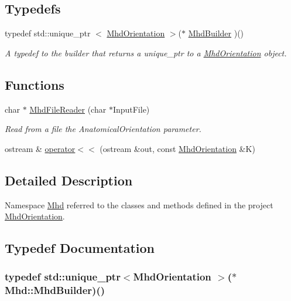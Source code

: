 \subsection*{\-Typedefs}
\begin{DoxyCompactItemize}
\item 
typedef std\-::unique\-\_\-ptr\*
$<$ \hyperlink{classMhd_1_1MhdOrientation}{\-Mhd\-Orientation} $>$($\ast$ \hyperlink{namespaceMhd_a9b520e48eb7e726a85e6224875935aff}{\-Mhd\-Builder} )()
\begin{DoxyCompactList}\small\item\em \-A typedef to the builder that returns a unique\-\_\-ptr to a \hyperlink{classMhd_1_1MhdOrientation}{\-Mhd\-Orientation} object. \end{DoxyCompactList}\end{DoxyCompactItemize}
\subsection*{\-Functions}
\begin{DoxyCompactItemize}
\item 
char $\ast$ \hyperlink{namespaceMhd_a85b72f6dc94ee4438e1511c3111686cb}{\-Mhd\-File\-Reader} (char $\ast$\-Input\-File)
\begin{DoxyCompactList}\small\item\em \-Read from a file the \-Anatomical\-Orientation parameter. \end{DoxyCompactList}\item 
ostream \& \hyperlink{namespaceMhd_a25ff0eba5426054880f213fb49a75670}{operator$<$$<$} (ostream \&out, const \hyperlink{classMhd_1_1MhdOrientation}{\-Mhd\-Orientation} \&\-K)
\end{DoxyCompactItemize}


\subsection{\-Detailed \-Description}
\-Namespace \hyperlink{namespaceMhd}{\-Mhd} referred to the classes and methods defined in the project \hyperlink{classMhd_1_1MhdOrientation}{\-Mhd\-Orientation}. 

\subsection{\-Typedef \-Documentation}
\hypertarget{namespaceMhd_a9b520e48eb7e726a85e6224875935aff}{
\subsubsection[{\-Mhd\-Builder}]{\setlength{\rightskip}{0pt plus 5cm}typedef std\-::unique\-\_\-ptr$<${\bf \-Mhd\-Orientation} $>$($\ast$  {\bf \-Mhd\-::\-Mhd\-Builder})()}}\label{namespaceMhd_a9b520e48eb7e726a85e6224875935aff}


